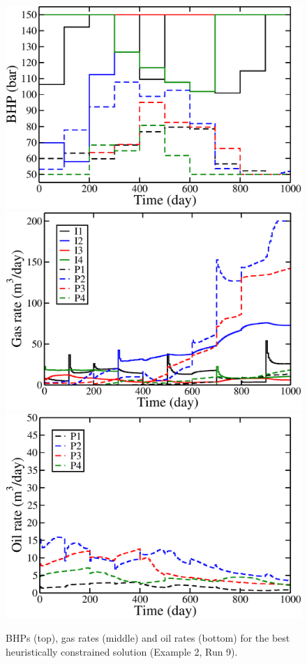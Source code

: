 \documentclass[twocolumn,numbook]{svjour3}          %
\begin{document}
\begin{figure}
\begin{center}
\includegraphics[totalheight=2.2in,angle=0]{spe10topLayerOptimalChoppedIuPu_BHP.pdf}
\includegraphics[totalheight=2.17in,angle=0]{spe10topLayerOptimalChoppedIuPu_rate_gas.pdf}
\includegraphics[totalheight=2.2in,angle=0]{spe10topLayerOptimalChoppedIuPu_rate_oil.pdf}
\end{center}
\caption{BHPs (top), gas rates (middle) and oil rates
  (bottom) for the best heuristically constrained solution (Example 2, Run 9).}
\label{fig:SPE10TopLayerUnconstrainedOptimalChoppedRates}
\end{figure}
\end{document}
